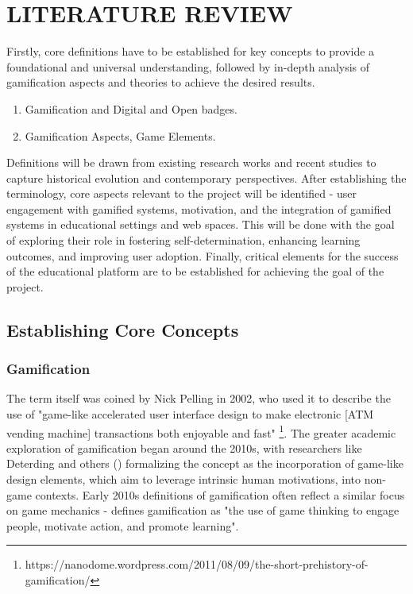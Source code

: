 \section{LITERATURE REVIEW}

Firstly, core definitions have to be established for key concepts to provide a foundational and universal understanding, followed by in-depth analysis of gamification  aspects and theories to achieve the desired results.

\begin{enumerate}
  \addtolength{\itemsep}{-0.5\baselineskip} 
  \item Gamification and Digital and Open badges.
  \item Gamification Aspects, Game Elements.
\end{enumerate}

Definitions will be drawn from existing research works and recent studies to capture historical evolution and contemporary perspectives. 
After establishing the terminology, core aspects relevant to the project will be identified - user engagement with gamified systems, motivation, and the integration of gamified systems in educational settings and web spaces. 
This will be done with the goal of exploring their role in fostering self-determination, enhancing learning outcomes, and improving user adoption. 
Finally, critical elements for the success of the educational platform are to be established for achieving the goal of the project.

%
\subsection{Establishing Core Concepts}

\subsubsection{Gamification}
%
The term itself was coined by Nick Pelling in 2002, who used it to describe the use of "game-like accelerated user interface design to make electronic [ATM vending machine] transactions both enjoyable and fast" \footnote{https://nanodome.wordpress.com/2011/08/09/the-short-prehistory-of-gamification/}. 
The greater academic exploration of gamification began around the 2010s, with researchers like Deterding and others (\cite{definition}) formalizing the concept as the incorporation of game-like design elements, which aim to leverage intrinsic human motivations, into non-game contexts.
Early 2010s definitions of gamification often reflect a similar focus on game mechanics - \textcite{definition2} defines gamification as "the use of game thinking to engage people, motivate action, and promote learning".

